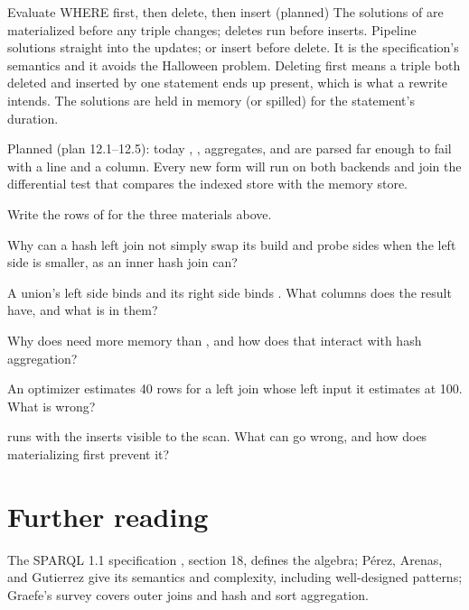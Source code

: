 \begin{decision}{Evaluate WHERE first, then delete, then insert (planned)}
 The solutions of  are materialized before any triple
changes; deletes run before inserts.
 Pipeline solutions straight into the updates; or insert
before delete.
 It is the specification's semantics and it avoids the Halloween
problem. Deleting first means a triple both deleted and inserted by one
statement ends up present, which is what a rewrite intends.
 The solutions are held in memory (or spilled) for the statement's
duration.
\end{decision}

\begin{status}
Planned (plan 12.1--12.5): today , , aggregates, and
 are parsed far enough to fail with a line and a
column. Every new form will run on both backends and join the differential test
that compares the indexed store with the memory store.
\end{status}

\begin{checkyourself}
\item Write the rows of  for the three materials above.
\item Why can a hash left join not simply swap its build and probe sides when the left side is smaller, as an inner hash join can?
\item A union's left side binds  and its right side binds . What columns does the result have, and what is in them?
\item Why does  need more memory than , and how does that interact with hash aggregation?
\item An optimizer estimates 40 rows for a left join whose left input it estimates at 100. What is wrong?
\item {} runs with the inserts visible to the scan. What can go wrong, and how does materializing  first prevent it?
\end{checkyourself}

\section*{Further reading}
The SPARQL 1.1 specification \cite{sparql}, section 18, defines the algebra;
Pérez, Arenas, and Gutierrez \cite{perez2009} give its semantics and
complexity, including well-designed patterns; Graefe's survey \cite{graefe}
covers outer joins and hash and sort aggregation.
